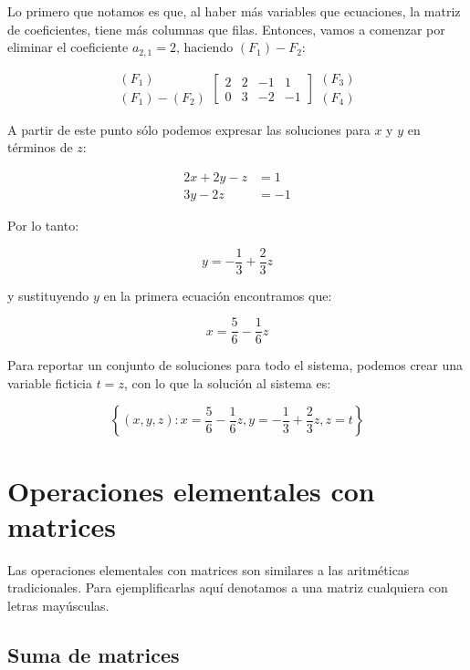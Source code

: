 \documentclass[
]{book}
\begin{document}
Lo primero que notamos es que, al haber más variables que ecuaciones, la matriz de coeficientes, tiene más columnas que filas. Entonces, vamos a comenzar por eliminar el coeficiente \(a_{2,1} = 2\), haciendo \((F_1)-F_2\):

\begin{equation}
\begin{array}{r}
(F_1) \\ (F_1) - (F_2)
\end{array}
\left[ 
\begin{array}{rrr|r}
2 & 2 &-1 & 1\\
0 & 3 &-2 &-1
\end{array}
\right]
\begin{array}{r}
(F_3) \\ (F_4)
\end{array}
\end{equation}

A partir de este punto sólo podemos expresar las soluciones para \(x\) y \(y\) en términos de \(z\):

\begin{align}
2x + 2y - z &= 1 \\
3y - 2z & = -1
\end{align}

Por lo tanto:

\[y = - \frac{1}{3} + \frac{2}{3}z\]

y sustituyendo \(y\) en la primera ecuación encontramos que:

\[x = \frac{5}{6} - \frac{1}{6}z\]

Para reportar un conjunto de soluciones para todo el sistema, podemos crear una variable ficticia \(t = z\), con lo que la solución al sistema es:

\[\left\{(x, y, z): x = \frac{5}{6} - \frac{1}{6}z, y = - \frac{1}{3} + \frac{2}{3}z, z = t \right\}\]

\hypertarget{operaciones-elementales-con-matrices}{%
\section{Operaciones elementales con matrices}\label{operaciones-elementales-con-matrices}}

Las operaciones elementales con matrices son similares a las aritméticas tradicionales. Para ejemplificarlas aquí denotamos a una matriz cualquiera con letras mayúsculas.

\hypertarget{suma-de-matrices}{%
\subsection{Suma de matrices}\label{suma-de-matrices}}
\end{document}
